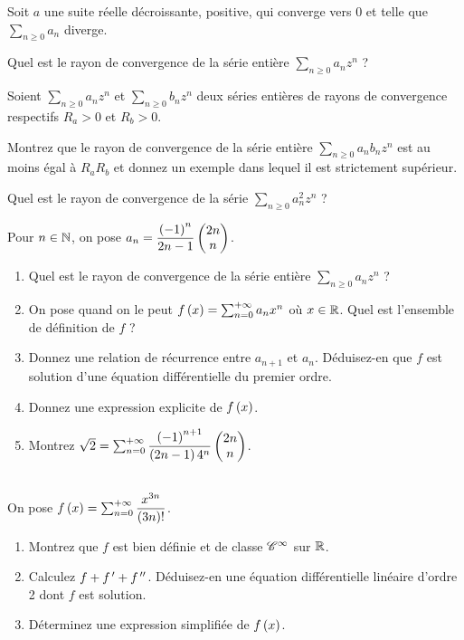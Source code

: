 \begin{exos}
Soit \(a\) une suite réelle décroissante, positive, qui converge vers \(0\) et telle que \(\sum_{n\geq0}a_n\) diverge.

Quel est le rayon de convergence de la série entière \(\sum_{n\geq0}a_nz^n\) ?
\end{exos}

\begin{exoss}
Soient \(\sum_{n\geq0}a_nz^n\) et \(\sum_{n\geq0}b_nz^n\) deux séries entières de rayons de convergence respectifs \(R_a>0\) et \(R_b>0\).

Montrez que le rayon de convergence de la série entière \(\sum_{n\geq0}a_nb_nz^n\) est au moins égal à \(R_aR_b\) et donnez un exemple dans lequel il est strictement supérieur.

Quel est le rayon de convergence de la série \(\sum_{n\geq0}a_n^2z^n\) ?
\end{exoss}

\begin{exoss}
Pour \(n\in\N\), on pose \(a_n=\dfrac{\paren{-1}^n}{2n-1}\binom{n}{2n}\).

\begin{enumerate}
    \item Quel est le rayon de convergence de la série entière \(\sum_{n\geq0}a_nz^n\) ? \\
    \item On pose quand on le peut \(f\paren{x}=\sum_{n=0}^{\pinf}a_nx^n\) où \(x\in\R\). Quel est l'ensemble de définition de \(f\) ? \\
    \item Donnez une relation de récurrence entre \(a_{n+1}\) et \(a_n\). Déduisez-en que \(f\) est solution d'une équation différentielle du premier ordre. \\
    \item Donnez une expression explicite de \(f\paren{x}\). \\
    \item Montrez \(\sqrt{2}=\sum_{n=0}^{\pinf}\dfrac{\paren{-1}^{n+1}}{\paren{2n-1}4^n}\binom{n}{2n}\).
\end{enumerate}
\end{exoss}

\begin{exoss}~\\
On pose \(f\paren{x}=\sum_{n=0}^{\pinf}\dfrac{x^{3n}}{\paren{3n}!}\).

\begin{enumerate}
    \item Montrez que \(f\) est bien définie et de classe \(\classe{\infty}\) sur \(\R\). \\
    \item Calculez \(f+f\prim+f\seconde\). Déduisez-en une équation différentielle linéaire d'ordre 2 dont \(f\) est solution. \\
    \item Déterminez une expression simplifiée de \(f\paren{x}\).
\end{enumerate}
\end{exoss}

